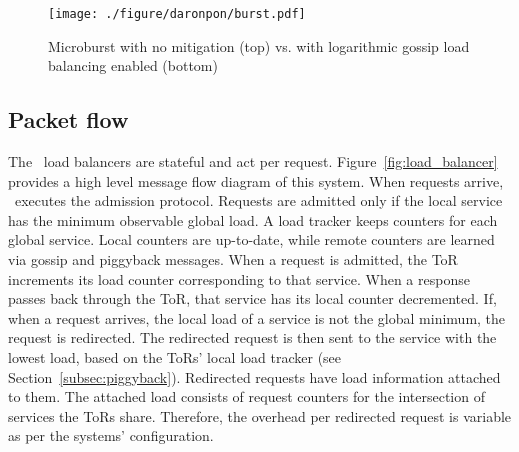 


\begin{figure}[t]
  \centering
    \texttt{[image: ./figure/daronpon/burst.pdf]}
    \centering

    \caption{Microburst with no mitigation (top) vs. with
    logarithmic gossip load balancing enabled (bottom)}

  \label{fig:microburst}
\end{figure}

\subsection{Packet flow}

The \systemname\ load balancers are stateful and act per request.
Figure~\ref{fig:load_balancer} provides a high level message flow diagram of
this system.  When requests arrive, \systemname\ executes the admission
protocol. Requests are admitted only if the local service has the minimum
observable global load. A load tracker keeps counters for each global service.
Local counters are up-to-date, while remote counters are learned via gossip and
piggyback messages.  When a request is admitted, the ToR increments its load
counter corresponding to that service.  When a response passes back through the
ToR, that service has its local counter decremented.  If, when a request
arrives, the local load of a service is not the global minimum, the request is
redirected. The redirected request is then sent to the service with the lowest
load, based on the ToRs' local load tracker (see
Section~\ref{subsec:piggyback}).  Redirected requests have load information
attached to them. The attached load consists of request counters for the
intersection of services the ToRs share.  Therefore, the overhead per
redirected request is variable as per the systems' configuration.

